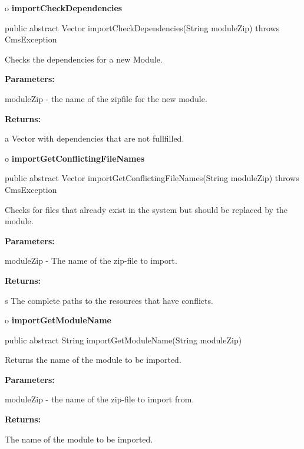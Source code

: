 o {\bf importCheckDependencies} 

\begin{PRE}
 public abstract Vector importCheckDependencies(String moduleZip) throws CmsException
\end{PRE}

\begin{description}
\htmlDD Checks the dependencies for a new Module. 

\begin{description}
\item {\bf Parameters:}  

moduleZip - the name of the zipfile for the new module.  
\item {\bf Returns:}  

a Vector with dependencies that are not fullfilled.  
\end{description}

\end{description}

o {\bf importGetConflictingFileNames} 

\begin{PRE}
 public abstract Vector importGetConflictingFileNames(String moduleZip) throws CmsException
\end{PRE}

\begin{description}
\htmlDD Checks for files that already exist in the system but should be
replaced by the module. 

\begin{description}
\item {\bf Parameters:}  

moduleZip - The name of the zip-file to import.  
\item {\bf Returns:}  

s The complete paths to the resources that have conflicts.  
\end{description}

\end{description}

o {\bf importGetModuleName} 

\begin{PRE}
 public abstract String importGetModuleName(String moduleZip)
\end{PRE}

\begin{description}
\htmlDD Returns the name of the module to be imported. 

\begin{description}
\item {\bf Parameters:}  

moduleZip - the name of the zip-file to import from.  
\item {\bf Returns:}  

The name of the module to be imported.  
\end{description}

\end{description}

